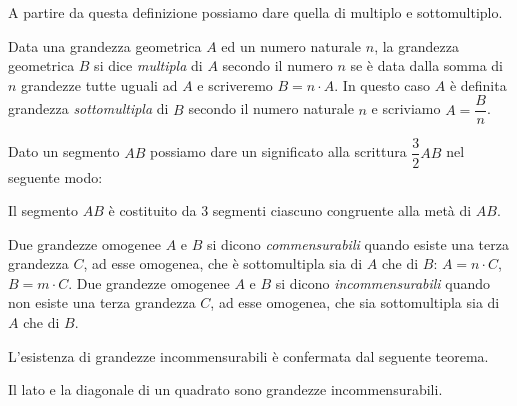 A partire da questa definizione possiamo dare quella di multiplo e 
sottomultiplo.
\begin{definizione}
Data una grandezza geometrica $A$ ed un numero naturale $n$, la 
grandezza geometrica $B$ si dice \emph{multipla} di $A$ secondo il 
numero $n$ se è data dalla somma di $n$ grandezze tutte uguali ad $A$ 
e scriveremo $B=n\cdot A$. In questo caso $A$ è definita grandezza 
\emph{sottomultipla} di $B$ secondo il numero naturale $n$ e 
scriviamo $A=\dfrac{B}{n}$.
\end{definizione}

Dato un segmento $AB$ possiamo dare un significato alla scrittura 
$\dfrac{3}{2}AB$ nel seguente modo:

\begin{figure*}[!htb]
	\centering
\end{figure*}

Il segmento $AB$ è costituito da 3 segmenti ciascuno congruente alla 
metà di $AB$.
\begin{definizione}
Due grandezze omogenee $A$ e $B$ si dicono \emph{commensurabili} 
quando esiste una terza grandezza $C$, ad esse omogenea, che è 
sottomultipla sia di $A$ che di $B$: $A=n\cdot C$, $B=m\cdot C$.
Due grandezze omogenee $A$ e $B$ si dicono \emph{incommensurabili} 
quando non esiste una terza grandezza $C$, ad esse omogenea, che sia 
sottomultipla sia di $A$ che di $B$.
\end{definizione}

L'esistenza di grandezze incommensurabili è confermata dal seguente 
teorema.
\begin{teorema}
Il lato e la diagonale di un quadrato sono grandezze incommensurabili.
\end{teorema}

\begin{figure*}[!htb]
	\centering
\end{figure*}

